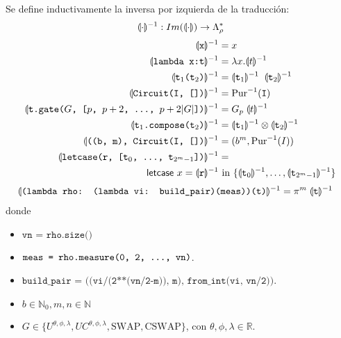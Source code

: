 \begin{definicion}
\label{def:inversa}
Se define inductivamente la inversa por izquierda de la traducción:
\[\llparenthesis \cdot \rrparenthesis^{-1}: Im(\llparenthesis \cdot \rrparenthesis) \rightarrow \Lambda_\rho^*\]
\begin{align*}
\llparenthesis \texttt{x} \rrparenthesis^{-1} &= x \\
\llparenthesis \texttt{lambda x:t} \rrparenthesis^{-1} &= \lambda x.\llparenthesis t \rrparenthesis^{-1} \\
\llparenthesis \texttt{t$_1$(t$_2$)} \rrparenthesis^{-1} &= \llparenthesis \texttt{t$_1$} \rrparenthesis^{-1}\;\;\llparenthesis \texttt{t$_2$} \rrparenthesis^{-1}\\
\llparenthesis \texttt{Circuit(I, [])} \rrparenthesis^{-1} &= \text{Pur}^{-1}(\texttt{I}) \\
\llparenthesis \texttt{t.gate(}G\texttt{, [}p\texttt{, }p+2\texttt{, \dots, }p+2|G|\texttt{])} \rrparenthesis^{-1} &= G_p\;\llparenthesis t \rrparenthesis^{-1} \\
\llparenthesis \texttt{t$_1$.compose(t$_2$)} \rrparenthesis^{-1} &= \llparenthesis \texttt{t$_1$} \rrparenthesis^{-1} \otimes \llparenthesis \texttt{t$_2$} \rrparenthesis^{-1} \\
\llparenthesis \texttt{((b, m), Circuit(I, [])} \rrparenthesis^{-1} &= (b^m, \text{Pur}^{-1}(I)) \\
\llparenthesis \texttt{letcase(r, [t$_0$, \dots, t$_{2^m-1}$])} \rrparenthesis^{-1} &= \\
\textsf{letcase }x = \llparenthesis \texttt{r} \rrparenthesis^{-1} &\textrm{ in } \{\llparenthesis \texttt{t$_0$} \rrparenthesis^{-1},\dots,\llparenthesis \texttt{t$_{2^m-1}$} \rrparenthesis^{-1}\}
\end{align*}
\vspace{-2\baselineskip}
\begin{align*}
\llparenthesis \texttt{(lambda rho: (lambda vi: build\_pair)(meas))(t)} \rrparenthesis^{-1} &=  \pi^m\;\llparenthesis \texttt{t} \rrparenthesis^{-1}
\end{align*}
donde
\begin{itemize}
    \item $\texttt{vn = rho.size()}$
    \item $\texttt{meas = rho.measure(0, 2, \dots, vn)}$.
    \item $\texttt{build\_pair = ((vi/(2**(vn/2-m)), m), from\_int(vi, vn/2))}$.
    \item $b \in \mathbb{N}_0,m,n \in  \mathbb{N}$
    \item $G \in \{U^{\theta, \phi, \lambda}, UC^{\theta, \phi, \lambda}, \textrm{SWAP}, \textrm{CSWAP}\}$, con $\theta, \phi, \lambda \in \mathbb{R}$.
\end{itemize}
\end{definicion}

